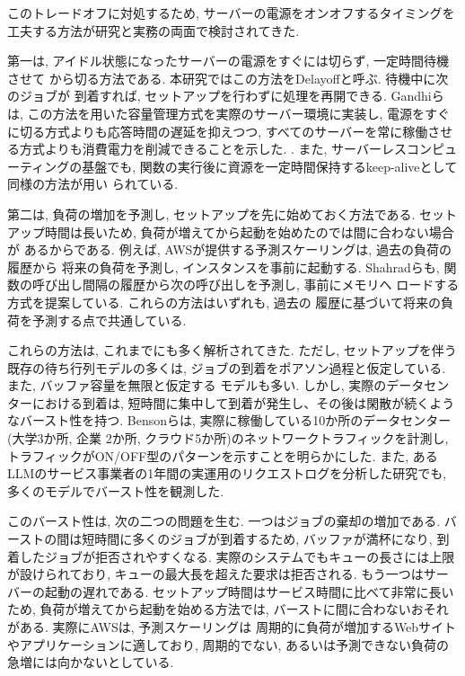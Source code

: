 \documentclass[a4paper, 11pt, dvipdfmx]{jsreport}
\begin{document}
このトレードオフに対処するため, サーバーの電源をオンオフするタイミングを
工夫する方法が研究と実務の両面で検討されてきた. 

第一は, アイドル状態になったサーバーの電源をすぐには切らず, 一定時間待機させて
から切る方法である. 本研究ではこの方法をDelayoffと呼ぶ. 待機中に次のジョブが
到着すれば, セットアップを行わずに処理を再開できる. Gandhiらは, この方法を用いた容量管理方式を実際のサーバー環境に実装し, 電源をすぐに切る方式よりも応答時間の遅延を抑えつつ, すべてのサーバーを常に稼働させる方式よりも消費電力を削減できることを示した. \cite{Gandhi2012AutoScale}. また, サーバーレスコンピューティングの基盤でも, 関数の実行後に資源を一定時間保持するkeep-aliveとして同様の方法が用い
られている\cite{Shahrad2020}. 

第二は, 負荷の増加を予測し, セットアップを先に始めておく方法である. セット
アップ時間は長いため, 負荷が増えてから起動を始めたのでは間に合わない場合が
あるからである. 例えば, AWSが提供する予測スケーリングは, 過去の負荷の履歴から
将来の負荷を予測し, インスタンスを事前に起動する\cite{AWSPredictive}. 
Shahradらも, 関数の呼び出し間隔の履歴から次の呼び出しを予測し, 事前にメモリへ
ロードする方式を提案している\cite{Shahrad2020}. これらの方法はいずれも, 過去の
履歴に基づいて将来の負荷を予測する点で共通している. 

これらの方法は, これまでにも多く解析されてきた. ただし, 
セットアップを伴う既存の待ち行列モデルの多くは, ジョブの到着をポアソン過程と仮定している. また, バッファ容量を無限と仮定する
モデルも多い. 
しかし, 実際のデータセンターにおける到着は, 短時間に集中して到着が発生し、その後は閑散が続くようなバースト性を持つ. 
Bensonらは, 実際に稼働している10か所のデータセンター(大学3か所, 企業
2か所, クラウド5か所)のネットワークトラフィックを計測し, トラフィックがON/OFF型のパターンを示すことを明らかにした\cite{Benson2010}. また, あるLLMのサービス事業者の1年間の実運用のリクエストログを分析した研究でも, 多くのモデルでバースト性を観測した\cite{AYearLLMServing}. 

このバースト性は, 次の二つの問題を生む. 一つはジョブの棄却の増加である. バーストの間は短時間に多くのジョブが到着するため, バッファが満杯になり, 到着したジョブが拒否されやすくなる. 
実際のシステムでもキューの長さには上限が設けられており, キューの最大長を超えた要求は拒否される\cite{Triton}. もう一つはサーバーの起動の遅れである. セットアップ時間はサービス時間に比べて非常に長い
ため, 負荷が増えてから起動を始める方法では, バーストに間に合わないおそれがある. 実際にAWSは, 予測スケーリングは
周期的に負荷が増加するWebサイトやアプリケーションに適しており, 周期的でない, あるいは予測できない負荷の急増には向かないとしている\cite{AWSBlog2018}. 
\end{document}
